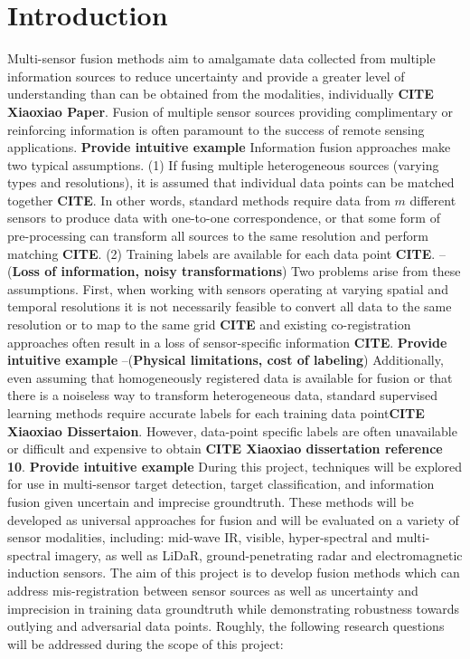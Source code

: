 \chapter{Introduction}
Multi-sensor fusion methods aim to amalgamate data collected from multiple information sources to reduce uncertainty and provide a greater level of understanding than can be obtained from the modalities, individually \textbf{CITE Xiaoxiao Paper}.  Fusion of multiple sensor sources providing complimentary or reinforcing information is often paramount to the success of remote sensing applications.  \textbf{Provide intuitive example} 
\newline
Information fusion approaches make two typical assumptions. (1) If fusing multiple heterogeneous sources (varying types and resolutions), it is assumed that individual data points can be matched together \textbf{CITE}. In other words, standard methods require data from $m$ different sensors to produce data with one-to-one correspondence, or that some form of pre-processing can transform all sources to the same resolution and perform matching \textbf{CITE}.  (2) Training labels are available for each data point \textbf{CITE}.     
\newline \noindent --(\textbf{Loss of information, noisy transformations}) \newline
Two problems arise from these assumptions.  First, when working with sensors operating at varying spatial and temporal resolutions it is not necessarily feasible to convert all data to the same resolution or to map to the same grid \textbf{CITE} and existing co-registration approaches often result in a loss of sensor-specific information \textbf{CITE}.  \textbf{Provide intuitive example}   
\newline \noindent --(\textbf{Physical limitations, cost of labeling}) \newline
Additionally, even assuming that homogeneously registered data is available for fusion or that there is a noiseless way to transform heterogeneous  data, standard supervised learning methods require accurate labels for each training data point\textbf{CITE Xiaoxiao Dissertaion}.  However, data-point specific labels are often unavailable or difficult and expensive to obtain \textbf{CITE Xiaoxiao dissertation reference 10}. \textbf{Provide intuitive example} 
\newline
During this project, techniques will be explored for use in multi-sensor target detection, target classification, and information fusion given uncertain and imprecise groundtruth.  These methods will be developed as universal approaches for fusion and will be evaluated on a variety of sensor modalities, including: mid-wave IR, visible, hyper-spectral and multi-spectral imagery, as well as LiDaR, ground-penetrating radar and electromagnetic induction sensors.  The aim of this project is to develop fusion methods which can address mis-registration between sensor sources as well as uncertainty and imprecision in training data groundtruth while demonstrating robustness towards outlying and adversarial data points. Roughly, the following research questions will be addressed during the scope of this project:
